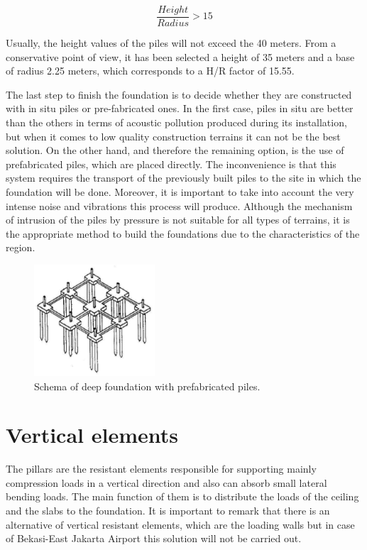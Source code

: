 \begin{equation}
\frac{Height}{Radius}>15
\end{equation}

Usually, the height values of the piles will not exceed the 40 meters. From a conservative point of view, it has been selected a height of 35 meters and a base of radius 2.25 meters, which corresponds to a H/R factor of 15.55.

The last step to finish the foundation is to decide whether they are constructed with in situ piles or pre-fabricated ones. In the first case, piles in situ are better than the others in terms of acoustic pollution produced during its installation, but when it comes to low quality construction terrains it can not be the best solution. On the other hand, and therefore the remaining option, is the use of prefabricated piles, which are placed directly. The inconvenience is that this system requires the transport of the previously built piles to the site in which the foundation will be done. Moreover, it is important to take into account the very intense noise and vibrations this process will produce. Although the mechanism of intrusion of the piles by pressure is not suitable for all types of terrains, it is the appropriate method to build the foundations due to the characteristics of the region.

\begin{figure}[H]
	\centering
	\includegraphics[clip, trim=0cm 0cm 0cm 0cm, width=0.4\textwidth]{./images/TipologiaEstructural/foundationprefabricated}
	\caption{Schema of deep foundation with prefabricated piles.}
	\label{foundation}
\end{figure}

	\section{Vertical elements}
The pillars are the resistant elements responsible for supporting mainly compression loads in a vertical direction and also can absorb small lateral bending loads. The main function of them is to distribute the loads of the ceiling and the slabs to the foundation. It is important to remark that there is an alternative of vertical resistant elements, which are the loading walls but in case of Bekasi-East Jakarta Airport this solution will not be carried out.

